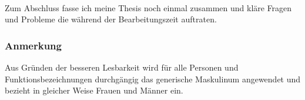 \\Zum Abschluss fasse ich meine Thesis noch einmal zusammen und kläre Fragen und Probleme die während der Bearbeitungszeit auftraten.

\vfill
\subsubsection{Anmerkung}
Aus Gründen der besseren Lesbarkeit wird für alle Personen und Funktionsbezeichnungen durchgängig das generische Maskulinum angewendet und bezieht in gleicher Weise Frauen und Männer ein.